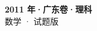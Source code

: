 \documentclass[zihao=-4, a4paper]{ctexart}
\begin{document}
\begin{center}
  {\Large\bfseries 2011 年·广东卷·理科}\\[4pt]
  {\large 数学 · 试题版}
\end{center}
\medskip
{}

\end{document}
